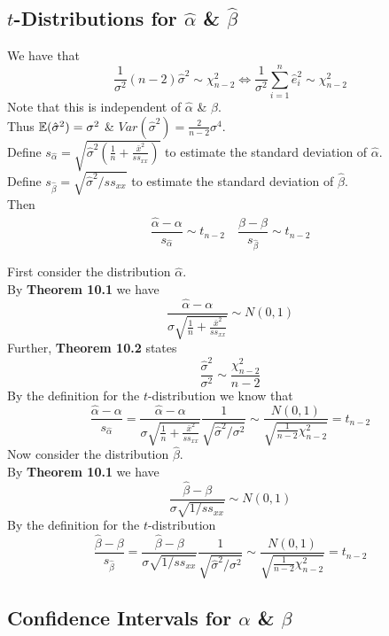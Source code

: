 \documentclass[11pt,a4paper]{article}
\begin{document}
\subsection{$t$-Distributions for $\hat{\alpha}$ \& $\hat{\beta}$}

We have that
$$\frac{1}{\sigma^2}(n-2)\hat{\sigma}^2\sim\chi_{n-2}^2\Longleftrightarrow\frac{1}{\sigma^2}\sum_{i=1}^n\hat{e}_i^2\sim\chi_{n-2}^2$$
Note that this is independent of $\hat{\alpha}$ \& $\hat{\beta}$.\\
Thus $\mathbb{E}(\hat{\sigma}^2)=\sigma^2$ \& $Var(\hat{\sigma}^2)=\frac{2}{n-2}\sigma^4$.\\

Define $s_{\hat{\alpha}}=\sqrt{\hat{\sigma}^2\left(\frac{1}{n}+\frac{\bar{x}^2}{ss_{xx}}\right)}$ to estimate the standard deviation of $\hat{\alpha}$.\\
Define $s_{\hat{\beta}}=\sqrt{\hat{\sigma}^2/ss_{xx}}$ to estimate the standard deviation of $\hat{\beta}$.\\
Then
$$\frac{\hat{\alpha}-\alpha}{s_{\hat{\alpha}}}\sim t_{n-2}\quad\frac{\hat{\beta}-\beta}{s_{\hat{\beta}}}\sim t_{n-2}$$

First consider the distribution $\hat{\alpha}$.\\
By \textbf{Theorem 10.1} we have
$$\frac{\hat{\alpha}-\alpha}{\sigma\sqrt{\frac{1}{n}+\frac{\bar{x}^2}{ss_{xx}}}}\sim N(0,1)$$
Further, \textbf{Theorem 10.2} states
$$\frac{\hat{\sigma}^2}{\sigma^2}\sim\frac{\chi_{n-2}^2}{n-2}$$
By the definition for the $t$-distribution we know that
$$\frac{\hat{\alpha}-\alpha}{s_{\hat{\alpha}}}=\frac{\hat{\alpha}-\alpha}{\sigma\sqrt{\frac{1}{n}+\frac{\bar{x}^2}{ss_{xx}}}}\frac{1}{\sqrt{\hat{\sigma}^2/\sigma^2}}\sim\frac{N(0,1)}{\sqrt{\frac{1}{n-2}\chi_{n-2}^2}}=t_{n-2}$$
Now consider the distribution $\hat{\beta}$.\\
By \textbf{Theorem 10.1} we have
$$\frac{\hat{\beta}-\beta}{\sigma\sqrt{1/ss_{xx}}}\sim N(0,1)$$
By the definition for the $t$-distribution
$$\frac{\hat{\beta}-\beta}{s_{\hat{\beta}}}=\frac{\hat{\beta}-\beta}{\sigma\sqrt{1/ss_{xx}}}\frac{1}{\sqrt{\hat{\sigma}^2/\sigma^2}}\sim\frac{N(0,1)}{\sqrt{\frac{1}{n-2}\chi_{n-2}^2}}=t_{n-2}$$

\subsection{Confidence Intervals for $\alpha$ \& $\beta$}
\end{document}

